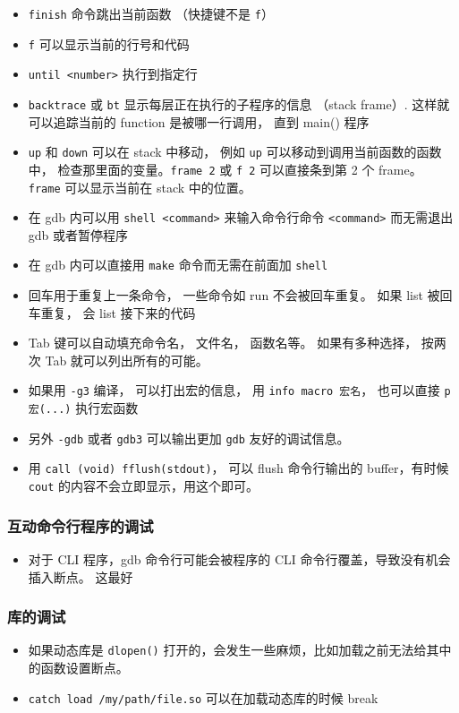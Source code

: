 \begin{itemize}
\item \verb`finish` 命令跳出当前函数 （快捷键不是 \verb`f`）
\item \verb`f` 可以显示当前的行号和代码
\item \verb`until <number>` 执行到指定行
\item \verb`backtrace` 或 \verb`bt` 显示每层正在执行的子程序的信息 （stack frame）. 这样就可以追踪当前的 function 是被哪一行调用， 直到 main() 程序
\item \verb`up` 和 \verb`down` 可以在 stack 中移动， 例如 \verb`up` 可以移动到调用当前函数的函数中， 检查那里面的变量。\verb`frame 2` 或 \verb`f 2` 可以直接条到第 2 个 frame。 \verb`frame` 可以显示当前在 stack 中的位置。
\item 在 gdb 内可以用 \verb`shell <command>` 来输入命令行命令 \verb`<command>` 而无需退出 gdb 或者暂停程序
\item 在 gdb 内可以直接用 \verb`make` 命令而无需在前面加 \verb`shell`
\item 回车用于重复上一条命令， 一些命令如 run 不会被回车重复。 如果 list 被回车重复， 会 list 接下来的代码
\item Tab 键可以自动填充命令名， 文件名， 函数名等。 如果有多种选择， 按两次 Tab 就可以列出所有的可能。
\item 如果用 \verb`-g3` 编译， 可以打出宏的信息， 用 \verb`info macro 宏名`， 也可以直接 \verb`p 宏(...)` 执行宏函数
\item 另外 \verb`-gdb` 或者 \verb`gdb3` 可以输出更加 \verb`gdb` 友好的调试信息。
\item 用 \verb`call (void) fflush(stdout)`， 可以 flush 命令行输出的 buffer，有时候 \verb`cout` 的内容不会立即显示，用这个即可。
\end{itemize}

\subsubsection{互动命令行程序的调试}
\begin{itemize}
\item 对于 CLI 程序，gdb 命令行可能会被程序的 CLI 命令行覆盖，导致没有机会插入断点。 这最好
\end{itemize}


\subsubsection{库的调试}
\begin{itemize}
\item 如果动态库是 \verb`dlopen()` 打开的，会发生一些麻烦，比如加载之前无法给其中的函数设置断点。
\item \verb`catch load /my/path/file.so` 可以在加载动态库的时候 break
\end{itemize}

